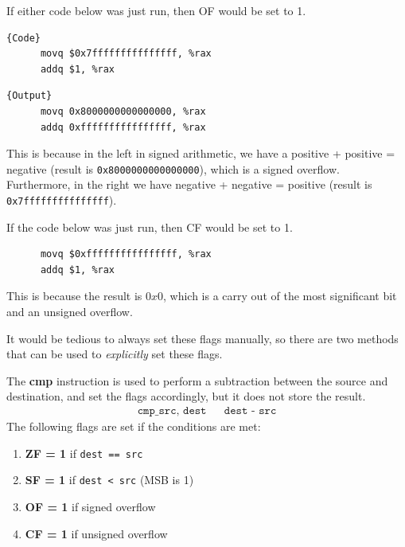 \documentclass{article}
\begin{document}
  \begin{example}
    If either code below was just run, then OF would be set to 1. 

    \noindent\begin{minipage}{.5\textwidth}
    \begin{lstlisting}[]{Code}
      movq $0x7fffffffffffffff, %rax 
      addq $1, %rax
    \end{lstlisting}
    \end{minipage}
    \hfill
    \begin{minipage}{.49\textwidth}
    \begin{lstlisting}[]{Output}
      movq 0x8000000000000000, %rax 
      addq 0xffffffffffffffff, %rax
    \end{lstlisting}
    \end{minipage}
    This is because in the left in signed arithmetic, we have a positive + positive = negative (result is \texttt{0x8000000000000000}), which is a signed overflow. Furthermore, in the right we have negative + negative = positive (result is \texttt{0x7fffffffffffffff}). 
  \end{example}

  \begin{example}
    If the code below was just run, then CF would be set to 1. 
    \begin{lstlisting}
      movq $0xffffffffffffffff, %rax 
      addq $1, %rax
    \end{lstlisting}
    This is because the result is $0x0$, which is a carry out of the most significant bit and an unsigned overflow.
  \end{example}

  It would be tedious to always set these flags manually, so there are two methods that can be used to \textit{explicitly} set these flags. 

  \begin{definition}[Compare]
    The \textbf{cmp} instruction is used to perform a subtraction between the source and destination, and set the flags accordingly, but it does not store the result.
    \begin{align*}
      \texttt{cmp\_ src, dest} && \texttt{dest - src} 
    \end{align*}
    The following flags are set if the conditions are met: 
    \begin{enumerate}
      \item \textbf{ZF = 1} if \texttt{dest == src} 
      \item \textbf{SF = 1} if \texttt{dest < src} (MSB is 1) 
      \item \textbf{OF = 1} if signed overflow 
      \item \textbf{CF = 1} if unsigned overflow
    \end{enumerate}
  \end{definition}
\end{document}
